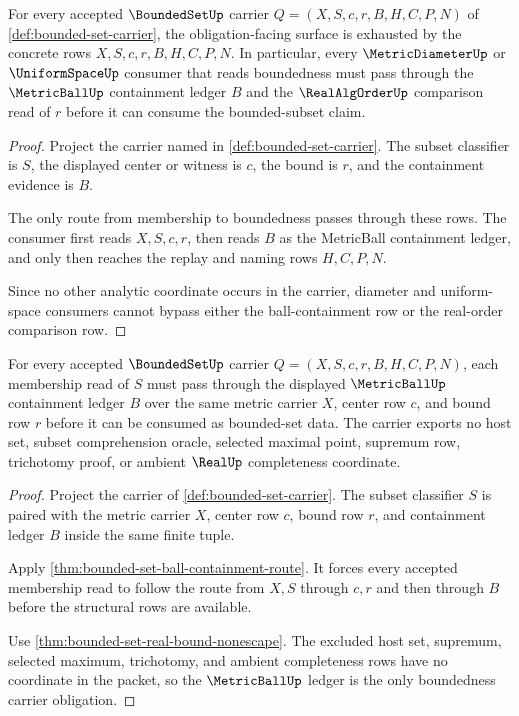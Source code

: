 \begin{theorem}
\label{thm:bounded-set-obligation-closure-rows}
For every accepted $\BoundedSetUp$ carrier $Q=(X,S,c,r,B,H,C,P,N)$ of \autoref{def:bounded-set-carrier}, the obligation-facing surface is exhausted by the concrete rows $X,S,c,r,B,H,C,P,N$. In particular, every $\MetricDiameterUp$ or $\UniformSpaceUp$ consumer that reads boundedness must pass through the $\MetricBallUp$ containment ledger $B$ and the $\RealAlgOrderUp$ comparison read of $r$ before it can consume the bounded-subset claim.
\end{theorem}
\begin{proof}
Project the carrier named in \autoref{def:bounded-set-carrier}. The subset classifier is $S$, the displayed center or witness is $c$, the bound is $r$, and the containment evidence is $B$.

The only route from membership to boundedness passes through these rows. The consumer first reads $X,S,c,r$, then reads $B$ as the MetricBall containment ledger, and only then reaches the replay and naming rows $H,C,P,N$.

Since no other analytic coordinate occurs in the carrier, diameter and uniform-space consumers cannot bypass either the ball-containment row or the real-order comparison row.
\end{proof}

\begin{theorem}
\label{thm:boundedset-metricball-carrier-obligation}
For every accepted $\BoundedSetUp$ carrier $Q=(X,S,c,r,B,H,C,P,N)$, each membership read of $S$ must pass through the displayed $\MetricBallUp$ containment ledger $B$ over the same metric carrier $X$, center row $c$, and bound row $r$ before it can be consumed as bounded-set data. The carrier exports no host set, subset comprehension oracle, selected maximal point, supremum row, trichotomy proof, or ambient $\RealUp$ completeness coordinate.
\end{theorem}
\begin{proof}
Project the carrier of \autoref{def:bounded-set-carrier}. The subset classifier $S$ is paired with the metric carrier $X$, center row $c$, bound row $r$, and containment ledger $B$ inside the same finite tuple.

Apply \autoref{thm:bounded-set-ball-containment-route}. It forces every accepted membership read to follow the route from $X,S$ through $c,r$ and then through $B$ before the structural rows are available.

Use \autoref{thm:bounded-set-real-bound-nonescape}. The excluded host set, supremum, selected maximum, trichotomy, and ambient completeness rows have no coordinate in the packet, so the $\MetricBallUp$ ledger is the only boundedness carrier obligation.
\end{proof}

